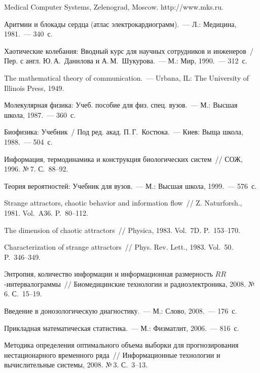 \begin{multicols}{2}
{{\begin{thebibliography}{99}
Medical Computer Systems, Zelenograd, Moscow. {\sf http://www.mks.ru}. 

Аритмии и блокады сердца (атлас электрокардиограмм).~--- Л.: Медицина, 
1981.~--- 340~с. 

Хаотические колебания: Вводный курс для научных сотрудников и инженеров~/
Пер. с англ. Ю.\,А.~Данилова и А.\,М.~Шукурова.~--- М.: Мир, 1990.~--- 312~с.

The mathematical theory of communication.~--- Urbana, IL: The University of 
Illinois Press, 1949.

Молекулярная физика: Учеб. пособие для физ. спец. вузов.~--- М.: Высшая 
школа, 1987.~--- 360~с. 

Биофизика: Учебник~/ Под ред. акад. П.\,Г.~Костюка.~--- Киев: Выща школа, 
1988.~--- 504~с.

Информация, термодинамика и конструкция биологических систем~// СОЖ, 
1996. №\,7. С.~88--92. 

Теория вероятностей: Учебник для вузов.~--- М.: Высшая школа, 1999.~--- 
576~с. 

Strange attractors, chaotic behavior and information flow~// Z. Naturforsh., 1981. 
Vol.~A36. P.~80--112.

The dimension of chaotic attractors~// Physica, 1983. Vol.~7D. P.~153--170. 

Characterization of strange attractors~// Phys. Rev. Lett., 1983. Vol.~50. 
P.~346--349.

Энтропия, количество информации и информационная размерность 
$RR$-ин\-тер\-ва\-ло\-грам\-мы~// Биомедицинские технологии и 
радиоэлектроника, 2008. №\,6. С.~15--19.


Введение в донозологическую диагностику.~--- М.: Слово, 2008.~--- 176~с. 

Прикладная математическая статистика.~--- М.: Физматлит, 2006.~--- 816~с.

Методика определения оптимального объема выборки для прогнозирования 
нестационарного временного ряда~// Информационные технологии и 
вычислительные системы, 2008. №\,3. С.~3--13. 


\end{thebibliography}}}
\end{multicols}
